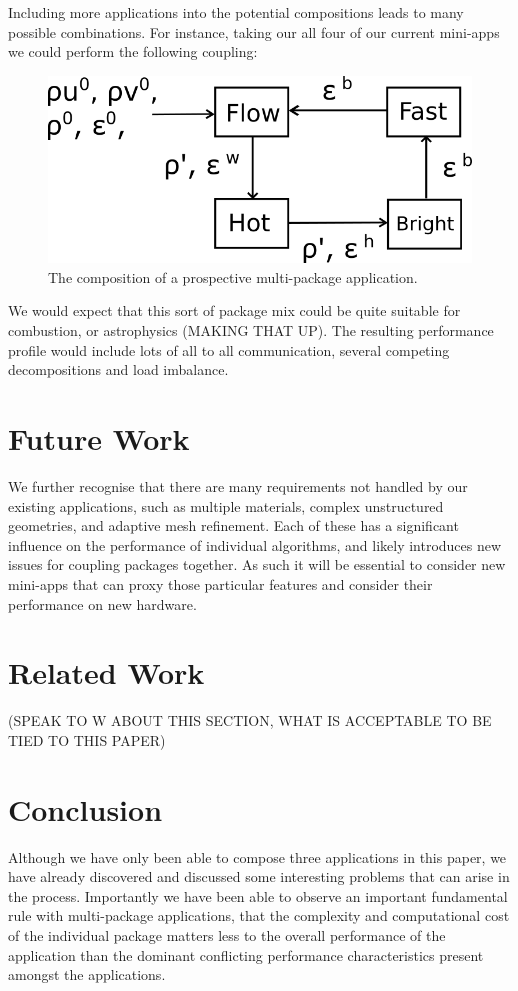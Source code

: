 \documentclass[runningheads,a4paper]{llncs}
\begin{document}
Including more applications into the potential compositions leads to many possible combinations. For instance, taking our all four of our current mini-apps we could perform the following coupling:

\begin{figure}
  \centering
  \includegraphics[width=0.6\linewidth]{all-four-flow}
  \caption{The composition of a prospective multi-package application.}
  \label{fig:multi-package-flow}
\end{figure}

We would expect that this sort of package mix could be quite suitable for combustion, or astrophysics (MAKING THAT UP). The resulting performance profile would include lots of all to all communication, several competing decompositions and load imbalance.

\section{Future Work}

We further recognise that there are many requirements not handled by our existing applications, such as multiple materials, complex unstructured geometries, and adaptive mesh refinement. Each of these has a significant influence on the performance of individual algorithms, and likely introduces new issues for coupling packages together. As such it will be essential to consider new mini-apps that can proxy those particular features and consider their performance on new hardware.

\section{Related Work}

(SPEAK TO W ABOUT THIS SECTION, WHAT IS ACCEPTABLE TO BE TIED TO THIS PAPER)

\section{Conclusion}

Although we have only been able to compose three applications in this paper, we have already discovered and discussed some interesting problems that can arise in the process. Importantly we have been able to observe an important fundamental rule with multi-package applications, that the complexity and computational cost of the individual package matters less to the overall performance of the application than the dominant conflicting performance characteristics present amongst the applications.



\end{document}
